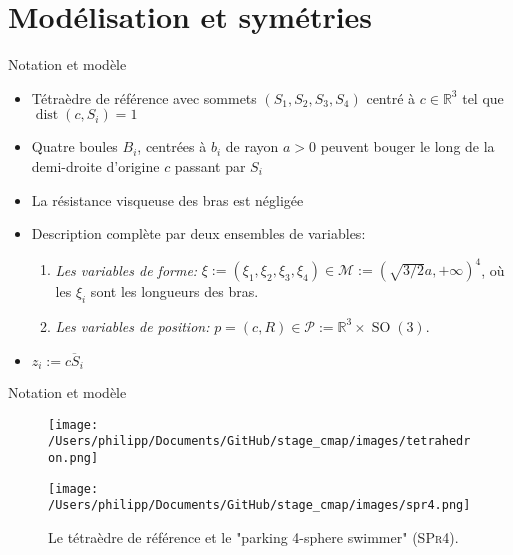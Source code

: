 \documentclass[10pt, envcountsect]{beamer}
\theoremstyle{plain}
\newcommand{\M}{\mathcal{M}}
\newcommand{\R}{\mathbb{R}}
\DeclareMathOperator{\dist}{dist}
\DeclareMathOperator{\SO}{SO}
\begin{document}
\section{Modélisation et symétries}

\begin{frame}{Notation et modèle}
\begin{itemize}
\item Tétraèdre de référence avec sommets $(S_1, S_2, S_3, S_4)$ centré à $c \in \R^3$ tel que $\dist(c, S_i) = 1$
\item Quatre boules $B_i$, centrées à $b_i$ de rayon $a > 0$ peuvent bouger le long de la demi-droite d'origine $c$ passant par $S_i$
\item La résistance visqueuse des bras est négligée
\item Description complète par deux ensembles de variables:
\begin{enumerate}
\item \emph{Les variables de forme:} $\xi := (\xi_1, \xi_2, \xi_3, \xi_4) \in \M := (\sqrt{3/2}a, + \infty)^4$, où les $\xi_i$ sont les longueurs des bras.

\item \emph{Les variables de position:} $p = (c, R) \in \mathcal{P} := \R^3 \times \SO(3)$.
\end{enumerate}
\item $z_i := \overline{c S_i}$
\end{itemize}

\end{frame}

\begin{frame}{Notation et modèle}
\begin{figure}[h]
    \centering
    \begin{minipage}{0.45\textwidth}
        \centering
        \texttt{[image: /Users/philipp/Documents/GitHub/stage\_cmap/images/tetrahedron.png]}
    \end{minipage}
    \begin{minipage}{0.45\textwidth}
        \centering
        \texttt{[image: /Users/philipp/Documents/GitHub/stage\_cmap/images/spr4.png]} %
    \end{minipage}
    \caption{Le tétraèdre de référence et le "parking 4-sphere swimmer" (\textsc{SPr4}).}
    \label{fig:reference tetrahedron and spr4}
\end{figure}

\end{frame}
\end{document}
